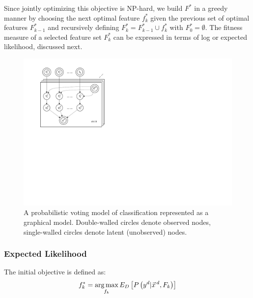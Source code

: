 Since jointly optimizing this objective is NP-hard, we build
$F^*$ in a greedy manner by choosing the next optimal feature $f^*_k$
given the previous set of optimal features $F^*_{k-1}$ and recursively
defining $F^*_k = F^*_{k-1}\cup f^*_k$ with $F^*_0 = \emptyset$. The
fitness measure of a selected feature set $F^*_k$ can be
expressed in terms of log or expected likelihood, discussed next.

\begin{figure}[tbp!]
	\centering
	\includegraphics[scale=0.9]{Plots_1.pdf}
	\caption{\footnotesize A probabilistic voting model of classification represented as a graphical model. 
Double-walled circles denote observed nodes, single-walled circles denote latent (unobserved) nodes.}
	\label{fig:model}
\end{figure}


\COMMENT
\subsubsection{Expected Likelihood}
The initial objective is defined as:
\[f_k^*=\argmax_{f_k}E_D\left[P\left(y^d|\vec{x}^{\,d},F_k\right)\right]\]

